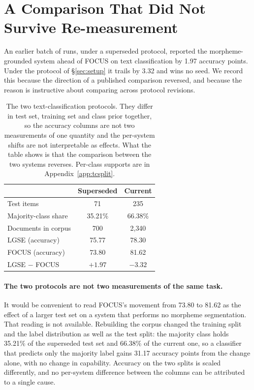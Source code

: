 \documentclass[11pt]{article}
\begin{document}
\section{A Comparison That Did Not Survive Re-measurement}
\label{sec:split}

An earlier batch of runs, under a superseded protocol, reported the
morpheme-grounded system ahead of FOCUS on text classification by 1.97
accuracy points. Under the protocol of \S\ref{sec:setup} it trails by 3.32
and wins no seed. We record this because the direction of a published
comparison reversed, and because the reason is instructive about comparing
across protocol revisions.

\begin{table}[t]
\centering
\small
\begin{tabular}{lcc}
\toprule
 & Superseded & Current \\
\midrule
Test items            & 71     & 235 \\
Majority-class share  & 35.21\% & 66.38\% \\
Documents in corpus   & 700    & 2{,}340 \\
\midrule
LGSE (accuracy)       & 75.77  & 78.30 \\
FOCUS (accuracy)      & 73.80  & 81.62 \\
LGSE $-$ FOCUS        & $+1.97$ & $-3.32$ \\
\bottomrule
\end{tabular}
\caption{The two text-classification protocols. They differ in test set,
training set and class prior together, so the accuracy columns are not two
measurements of one quantity and the per-system shifts are not interpretable
as effects. What the table shows is that the comparison between the two
systems reverses. Per-class supports are in Appendix~\ref{app:tcsplit}.}
\label{tab:split}
\end{table}

\paragraph{The two protocols are not two measurements of the same task.}
It would be convenient to read FOCUS's movement from 73.80 to 81.62 as the
effect of a larger test set on a system that performs no morpheme
segmentation. That reading is not available. Rebuilding the corpus changed
the training split and the label distribution as well as the test split: the
majority class holds 35.21\% of the superseded test set and 66.38\% of the
current one, so a classifier that predicts only the majority label gains
31.17 accuracy points from the change alone, with no change in capability.
Accuracy on the two splits is scaled differently, and no per-system
difference between the columns can be attributed to a single cause.
\end{document}
